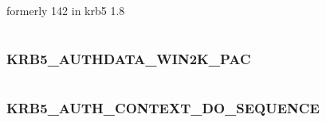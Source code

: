 \documentclass[letterpaper,10pt,english]{sphinxmanual}
\begin{document}
\begin{fulllineitems}
\label{appdev/refs/macros/KRB5_AUTHDATA_SIGNTICKET:KRB5_AUTHDATA_SIGNTICKET}
\end{fulllineitems}


formerly 142 in krb5 1.8

\begin{tabulary}{\linewidth}{|L|L|}
\hline

 & 
\\\hline
\end{tabulary}



\subsubsection{KRB5\_AUTHDATA\_WIN2K\_PAC}
\label{appdev/refs/macros/KRB5_AUTHDATA_WIN2K_PAC:krb5-authdata-win2k-pac-data}\label{appdev/refs/macros/KRB5_AUTHDATA_WIN2K_PAC::doc}\label{appdev/refs/macros/KRB5_AUTHDATA_WIN2K_PAC:krb5-authdata-win2k-pac}

\begin{fulllineitems}
\label{appdev/refs/macros/KRB5_AUTHDATA_WIN2K_PAC:KRB5_AUTHDATA_WIN2K_PAC}
\end{fulllineitems}


\begin{tabulary}{\linewidth}{|L|L|}
\hline

 & 
\\\hline
\end{tabulary}



\subsubsection{KRB5\_AUTH\_CONTEXT\_DO\_SEQUENCE}
\label{appdev/refs/macros/KRB5_AUTH_CONTEXT_DO_SEQUENCE:krb5-auth-context-do-sequence-data}\label{appdev/refs/macros/KRB5_AUTH_CONTEXT_DO_SEQUENCE:krb5-auth-context-do-sequence}\label{appdev/refs/macros/KRB5_AUTH_CONTEXT_DO_SEQUENCE::doc}

\begin{fulllineitems}
\label{appdev/refs/macros/KRB5_AUTH_CONTEXT_DO_SEQUENCE:KRB5_AUTH_CONTEXT_DO_SEQUENCE}
\end{fulllineitems}
\end{document}
